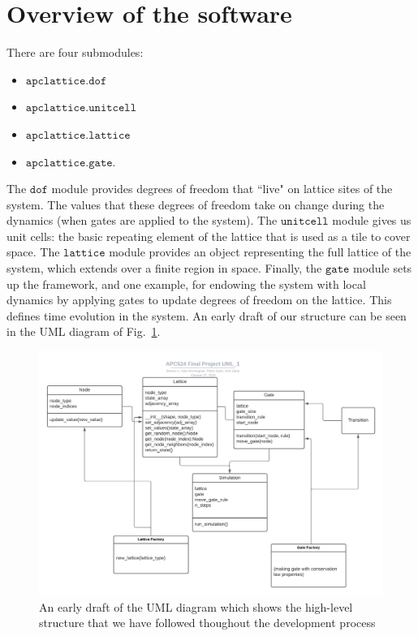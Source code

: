 \documentclass{article}
\begin{document}
\section{Overview of the software}
There are four submodules:
\begin{itemize}
    \item $\texttt{apclattice.dof}$
    \item $\texttt{apclattice.unitcell}$
    \item $\texttt{apclattice.lattice}$
    \item $\texttt{apclattice.gate}$.
\end{itemize}
The $\texttt{dof}$ module provides degrees of freedom that ``live" on lattice sites of the system. The values that these degrees of freedom take on change during the dynamics (when gates are applied to the system). The $\texttt{unitcell}$ module gives us unit cells: the basic repeating element of the lattice that is used as a tile to cover space. The $\texttt{lattice}$ module provides an object representing the full lattice of the system, which extends over a finite region in space. Finally, the $\texttt{gate}$ module sets up the framework, and one example, for endowing the system with local dynamics by applying gates to update degrees of freedom on the lattice. This defines time evolution in the system.  An early draft of our structure can be seen in the UML diagram of Fig.~\ref{fig:uml}.
\begin{figure}[ht]
    \centering
    \includegraphics[width=1\textwidth]{APC524_FinalProject_UML.png}
    \caption{An early draft of the UML diagram which shows the high-level structure that we have followed thoughout the development process}
    \label{fig:uml}
\end{figure}
\end{document}
